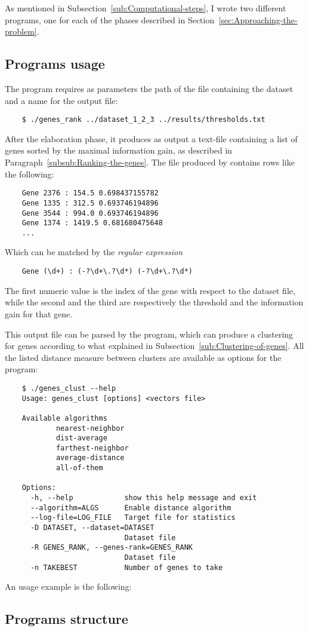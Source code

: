 As mentioned in Subsection~\ref{sub:Computational-steps}, I wrote two
different programs, one for each of the phases described in
Section~\ref{sec:Approaching-the-problem}.

\subsection{ Programs usage }

    The program  requires as parameters the path
    of the file containing the dataset and a name for the output file:
    \begin{verbatim}
    $ ./genes_rank ../dataset_1_2_3 ../results/thresholds.txt
    \end{verbatim}

    After the elaboration phase, it produces as output a text-file
    containing a list of genes sorted by the maximal information gain, as
    described in Paragraph~\ref{subsub:Ranking-the-genes}. The file
    produced by  contains rows like the following:
    \begin{verbatim}
    Gene 2376 : 154.5 0.698437155782
    Gene 1335 : 312.5 0.693746194896
    Gene 3544 : 994.0 0.693746194896
    Gene 1374 : 1419.5 0.681680475648
    ...
    \end{verbatim}

    Which can be matched by the \emph{regular expression}
    \begin{verbatim}
    Gene (\d+) : (-?\d+\.?\d*) (-?\d+\.?\d*)
    \end{verbatim}

    The first numeric value is the index of the gene with respect to the
    dataset file, while the second and the third are respectively the
    threshold and the information gain for that gene.

    This output file can be parsed by the  program,
    which can produce a clustering for genes according to what explained
    in Subsection~\ref{sub:Clustering-of-genes}. All the listed distance
    measure between clusters are available as options for the program:
    \begin{verbatim}
    $ ./genes_clust --help
    Usage: genes_clust [options] <vectors file>

    Available algorithms
            nearest-neighbor
            dist-average
            farthest-neighbor
            average-distance
            all-of-them

    Options:
      -h, --help            show this help message and exit
      --algorithm=ALGS      Enable distance algorithm
      --log-file=LOG_FILE   Target file for statistics
      -D DATASET, --dataset=DATASET
                            Dataset file
      -R GENES_RANK, --genes-rank=GENES_RANK
                            Dataset file
      -n TAKEBEST           Number of genes to take
    \end{verbatim}

    An usage example is the following:

\subsection{ Programs structure }
